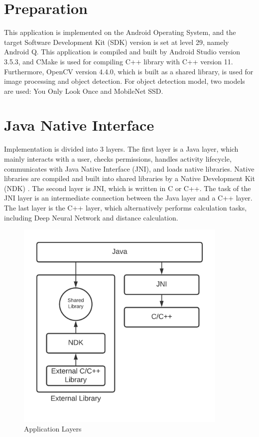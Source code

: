     \section{Preparation}
        This application is implemented on the Android Operating System,
        and the target Software Development Kit (SDK) version is set at level 29, namely Android Q.
        This application is compiled and built by Android Studio version 3.5.3,
        and CMake is used for compiling C++ library with C++ version 11.
        Furthermore, OpenCV version 4.4.0, which is built as a shared library, is used for image processing and object detection.
        For object detection model, two models are used: You Only Look Once and MobileNet SSD.

    \section{Java Native Interface}
        Implementation is divided into 3 layers.
            The first layer is a Java layer, which mainly interacts with a user,
            checks permissions, handles activity lifecycle, communicates with Java Native Interface (JNI), and loads native libraries.
                Native libraries are compiled and built into shared libraries by a Native Development Kit (NDK) \cite{NDK-COOKBOOK}.
            The second layer is JNI, which is written in C or C++.
                The task of the JNI layer is an intermediate connection between the Java layer and a C++ layer.
            The last layer is the C++ layer, which alternatively performs calculation tasks,
            including Deep Neural Network and distance calculation.

        \begin{figure}[!ht]
            \centering
            \includegraphics[width=4in]{images/chapter3/application-layers.png}
            \caption{Application Layers}
            \label{systemOverview}
        \end{figure}

